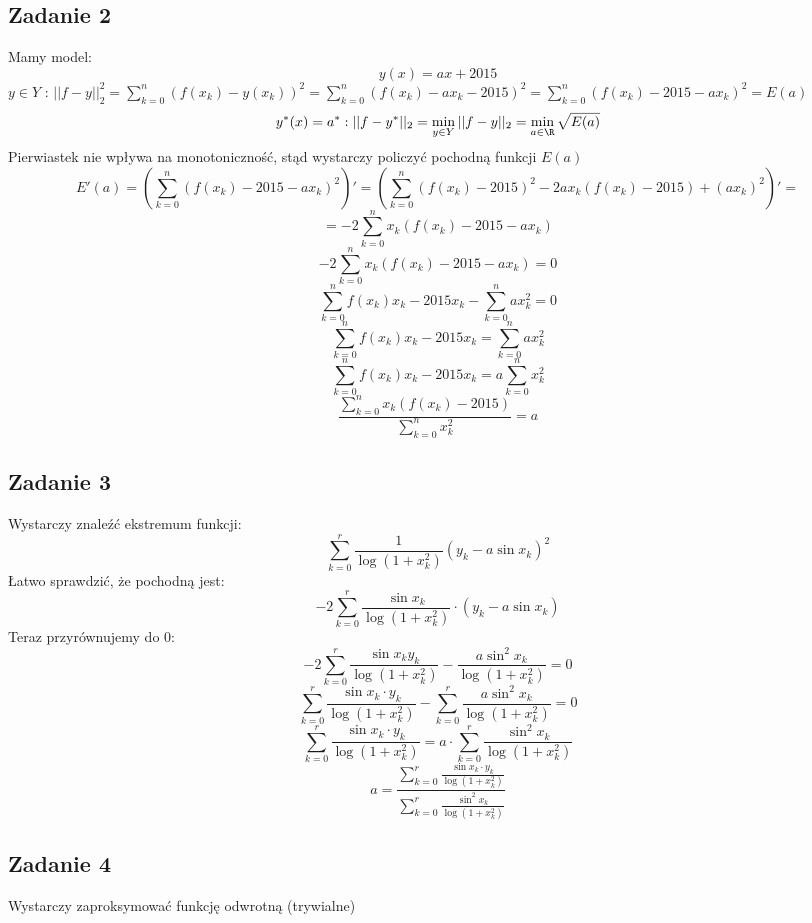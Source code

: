 \documentclass[a4paper]{article}
\begin{document}
\subsection*{Zadanie 2}
Mamy model:
$$y(x)=ax+2015$$
$y \in Y$ : $|| f-y ||_2^2 = \sum\limits_{k=0}^n (f(x_k) - y(x_k))^2 = \sum\limits_{k=0}^n (f(x_k) - ax_k - 2015)^2 = \sum\limits_{k=0}^n (f(x_k) - 2015 - ax_k)^2 = E(a)$
$$y^*(x)=a^* : ||f-y^*||_2 = \min\limits_{y \in Y}||f-y||_2=\min\limits_{a \in \R}\sqrt{E(a)}$$
Pierwiastek nie wpływa na monotoniczność, stąd wystarczy policzyć pochodną funkcji $E(a)$
$$E'(a) =  \left( \sum\limits_{k=0}^n (f(x_k) - 2015 - ax_k)^2 \right)' = \left( \sum\limits_{k=0}^n (f(x_k) - 2015)^2 - 2ax_k(f(x_k) - 2015) + (ax_k)^2 \right)' = $$ $$ = -2 \sum\limits_{k=0}^n x_k(f(x_k) - 2015 - ax_k) $$
$$-2 \sum\limits_{k=0}^n x_k(f(x_k) - 2015 - ax_k) = 0$$
$$ \sum\limits_{k=0}^n f(x_k)x_k - 2015x_k -  \sum\limits_{k=0}^n ax_k^2 = 0 $$
$$ \sum\limits_{k=0}^n f(x_k)x_k - 2015x_k =  \sum\limits_{k=0}^n ax_k^2 $$
$$ \sum\limits_{k=0}^n f(x_k)x_k - 2015x_k =  a\sum\limits_{k=0}^n x_k^2 $$
$$ \frac{\sum\limits_{k=0}^n x_k(f(x_k) - 2015)}{\sum\limits_{k=0}^n x_k^2} =  a$$


\subsection*{Zadanie 3}
Wystarczy znaleźć ekstremum funkcji:
$$\sum\limits_{k=0}^r \frac{1}{\log{(1+x_k^2)}}(y_k-a\sin{x_k})^2 $$
Łatwo sprawdzić, że pochodną jest:\\
$$-2 \sum\limits_{k=0}^{r} \frac{\sin{x_k}}{\log{(1+x_k^2)}}\cdot (y_k-a\sin{x_k})$$
Teraz przyrównujemy do 0:
$$-2 \sum\limits_{k=0}^{r} \frac{\sin{x_k}y_k}{\log{(1+x_k^2)}} - \frac{a\sin^2{x_k}}{\log{(1+x_k^2)}}= 0$$
$$ \sum\limits_{k=0}^{r} \frac{\sin{x_k}\cdot y_k}{\log{(1+x_k^2)}} - \sum\limits_{k=0}^{r} \frac{a\sin^2{x_k}}{\log{(1+x_k^2)}} = 0$$
$$ \sum\limits_{k=0}^{r} \frac{\sin{x_k}\cdot y_k}{\log{(1+x_k^2)}} = a\cdot \sum\limits_{k=0}^{r} \frac{\sin^2{x_k}}{\log{(1+x_k^2)}} $$
$$ a = \frac{\sum\limits_{k=0}^{r} \frac{\sin{x_k}\cdot y_k}{\log{(1+x_k^2)}}}{\sum\limits_{k=0}^{r} \frac{\sin^2{x_k}}{\log{(1+x_k^2)}}}$$

\subsection*{Zadanie 4}
Wystarczy zaproksymować funkcję odwrotną (trywialne)
\end{document}
